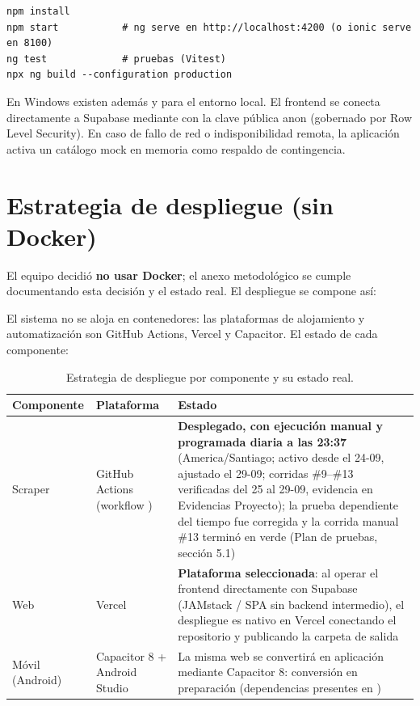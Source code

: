 \documentclass[11pt,a4paper]{article}
\begin{document}
\begin{verbatim}
npm install
npm start           # ng serve en http://localhost:4200 (o ionic serve en 8100)
ng test             # pruebas (Vitest)
npx ng build --configuration production
\end{verbatim}

En Windows existen además  y  para el entorno
local. El frontend se conecta directamente a Supabase mediante
 con la clave pública anon (gobernado por Row Level Security).
En caso de fallo de red o indisponibilidad remota, la aplicación activa un catálogo
mock en memoria como respaldo de contingencia.

\section{Estrategia de despliegue (sin Docker)}

El equipo decidió \textbf{no usar Docker}; el anexo metodológico se cumple
documentando esta decisión y el estado real. El despliegue se compone así:

El sistema no se aloja en contenedores: las plataformas de alojamiento y
automatización son GitHub Actions, Vercel y Capacitor. El estado de cada
componente:

\begin{table}[h!]
\centering\small
\begin{tabular}{@{}L{3.0cm}L{5.6cm}L{6.2cm}@{}}
\toprule
\textbf{Componente} & \textbf{Plataforma} & \textbf{Estado} \\
\midrule
Scraper & GitHub Actions (workflow ) & \textbf{Desplegado, con ejecución manual y programada diaria a las 23:37} (America/Santiago; activo desde el 24-09, ajustado el 29-09; corridas \#9--\#13 verificadas del 25 al 29-09, evidencia en Evidencias Proyecto); la prueba dependiente del tiempo fue corregida y la corrida manual \#13 terminó en verde (Plan de pruebas, sección 5.1) \\
Web & Vercel & \textbf{Plataforma seleccionada}: al operar el frontend directamente con Supabase (JAMstack / SPA sin backend intermedio), el despliegue es nativo en Vercel conectando el repositorio y publicando la carpeta de salida  \\
Móvil (Android) & Capacitor 8 + Android Studio & La misma web se convertirá en aplicación mediante Capacitor 8: conversión en preparación (dependencias presentes en ) \\
\bottomrule
\end{tabular}
\caption{Estrategia de despliegue por componente y su estado real.}
\end{table}
\end{document}

